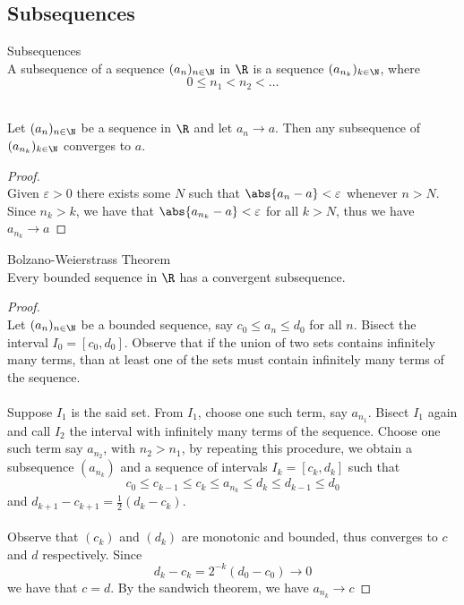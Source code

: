 \documentclass[a4paper]{article}
\begin{document}
\subsection{Subsequences}
\begin{defn}{Subsequences}{}\\ A subsequence of a sequence $(a_n)_{n\in\N}$ in $\R$ is a sequence $(a_{n_k})_{k\in\N}$, where $$0\leq n_1<n_2<\dots$$
\end{defn}

\begin{prp}{}{}\\ Let $(a_n)_{n\in\N}$ be a sequence in $\R$ and let $a_n\to a$. Then any subsequence of $(a_{n_k})_{k\in\N}$ converges to $a$. 
\begin{proof}\\ Given $\varepsilon>0$ there exists some $N$ such that $\abs{a_n-a}<\varepsilon$ whenever $n>N$. Since $n_k>k$, we have that $\abs{a_{n_k}-a}<\varepsilon$ for all $k>N$, thus we have $a_{n_k}\to a$
\end{proof}
\end{prp}

\begin{thm}{Bolzano-Weierstrass Theorem}{}\\ Every bounded sequence in $\R$ has a convergent subsequence. 
\begin{proof}\\ Let $(a_n)_{n\in\N}$ be a bounded sequence, say $c_0\leq a_n\leq d_0$ for all $n$. Bisect the interval $I_0=[c_0,d_0]$. Observe that if the union of two sets contains infinitely many terms, than at least one of the sets must contain infinitely many terms of the sequence. \\~\\
Suppose $I_1$ is the said set. From $I_1$, choose one such term, say $a_{n_1}$. Bisect $I_1$ again and call $I_2$ the interval with infinitely many terms of the sequence. Choose one such term say $a_{n_2}$, with $n_2>n_1$, by repeating this procedure, we obtain a subsequence $(a_{n_k})$ and a sequence of intervals $I_k=[c_k,d_k]$ such that $$c_0\leq c_{k-1}\leq c_k\leq a_{n_k}\leq d_k\leq d_{k-1}\leq d_0$$ and $d_{k+1}-c_{k+1}=\frac{1}{2}(d_k-c_k)$. \\~\\
Observe that $(c_k)$ and $(d_k)$ are monotonic and bounded, thus converges to $c$ and $d$ respectively. Since $$d_k-c_k=2^{-k}(d_0-c_0)\to 0$$ we have that $c=d$. By the sandwich theorem, we have $a_{n_k}\to c$
\end{proof}
\end{thm}
\end{document}
